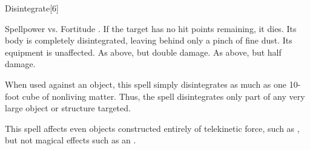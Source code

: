 \begin{spellsection}{Disintegrate}[6]
    \begin{spellheader}
    \end{spellheader}
    \begin{spellcontent}
        \begin{spelltargetinginfo}
        \end{spelltargetinginfo}
        \begin{spelleffects}
            \begin{spellattack}{Spellpower vs. Fortitude}
                \spellsuccess {}. If the target has no hit points remaining, it dies. Its body is completely disintegrated, leaving behind only a pinch of fine dust. Its equipment is unaffected.
                \spellcritical As above, but double damage.
                \spellfailure As above, but half damage.
            \end{spellattack}
            \spellspecial When used against an object, this spell simply disintegrates as much as one 10-foot cube of nonliving matter. Thus, the spell disintegrates only part of any very large object or structure targeted.
        \end{spelleffects}
    \end{spellcontent}
    \begin{spellfooter}
        \spellnotes This spell affects even objects constructed entirely of telekinetic force, such as , but not magical effects such as an .
        \miscastrandom
    \end{spellfooter}
    \begin{spellaugments}
    \end{spellaugments}
\end{spellsection}

